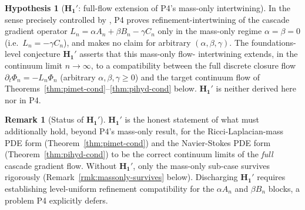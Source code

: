 \documentclass[11pt, a4paper]{amsart}
\theoremstyle{definition}
\newtheorem{remark}[theorem]{Remark}
\newtheorem{hypothesis}[theorem]{Hypothesis}
\begin{document}
\begin{hypothesis}[$\mathbf{H_1'}$: full-flow extension of P4's mass-only intertwining]
\label{hyp:full-flow}
In the sense precisely controlled by \cite[\S 7]{CascadeClosureDynamics},
P4 proves refinement-intertwining of the cascade gradient operator
$L_n = \alpha A_n + \beta B_n - \gamma C_n$ only in the mass-only
regime $\alpha = \beta = 0$ (i.e.\ $L_n = -\gamma C_n$), and makes
no claim for arbitrary $(\alpha, \beta, \gamma)$. The foundations-
level conjecture $\mathbf{H_1'}$ asserts that this mass-only flow-
intertwining extends, in the continuum limit $n \to \infty$, to a
compatibility between the full discrete closure flow $\partial_t
\Phi_n = -L_n \Phi_n$ (arbitrary $\alpha, \beta, \gamma \geq 0$)
and the target continuum flow of
Theorems~\ref{thm:pimet-cond}--\ref{thm:pihyd-cond} below. $\mathbf{H_1'}$
is neither derived here nor in P4.
\end{hypothesis}

\begin{remark}[Status of $\mathbf{H_1'}$]
\label{rmk:Hprime-status}
$\mathbf{H_1'}$ is the honest statement of what must additionally
hold, beyond P4's mass-only result, for the Ricci-Laplacian-mass
PDE form (Theorem~\ref{thm:pimet-cond}) and the Navier-Stokes PDE
form (Theorem~\ref{thm:pihyd-cond}) to be the correct continuum
limits of the \emph{full} cascade gradient flow. Without $\mathbf{H_1'}$,
only the mass-only sub-case survives rigorously
(Remark~\ref{rmk:massonly-survives} below). Discharging $\mathbf{H_1'}$
requires establishing level-uniform refinement compatibility for
the $\alpha A_n$ and $\beta B_n$ blocks, a problem P4 explicitly
defers.
\end{remark}
\end{document}
